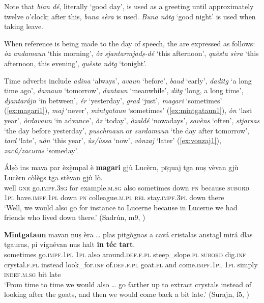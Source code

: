 Note that \textit{bian dé}, literally `good day', is used as a greeting until approximately twelve o'clock; after this, \textit{buna sèra} is used. \textit{Buna nòtg} `good night' is used when taking leave. 

When reference is being made to the day of speech, the  are expressed as follows: \textit{òz andamaun} `this morning', \textit{òz sjantarmjadṣ-dé} `this afternoon', \textit{quèsta sèra} `this afternoon, this evening', \textit{quèsta nòtg} `tonight'.

Time adverbs include \textit{adina} `always', \textit{avaun} `before', \textit{baud} `early', \textit{daditg} `a long time ago', \textit{damaun} `tomorrow', \textit{dantaun} `meanwhile', \textit{ditg} `long, a long time', \textit{djantarájn} `in between', \textit{ér} `yesterday', \textit{grad} `just', \textit{magari} `sometimes' (\ref{ex:magari1}), \textit{maj} `never', \textit{mintgataun} `sometimes' (\ref{ex:mintgataun1}), \textit{òn} `last year', \textit{òrdavaun} `in advance', \textit{òz} `today', \textit{òzaldé} `nowadays', \textit{savèns} `often', \textit{stjarsas} `the day before yesterday', \textit{pusch\-maun} or \textit{surdamaun} `the day after tomorrow', \textit{tard} `late', \textit{uòn} `this year', \textit{ùs/ùssa} `now', \textit{vònzaj} `later' (\ref{ex:vonzaj1}), \textit{zacú/zacuras} `someday'.

\ea
\label{ex:magari1}
	\gll  Álṣò ins mava par èxè̱mpal è \textbf{magari} gjù Lucèrn, pr̩quaj tga nuṣ vèvan gjù Lucèrn còlègs tga stèvan gjù lò.\\
well \textsc{gnr} go.\textsc{impf.3sg} for example\textsc{.m.sg} also sometimes down \textsc{pn} because \textsc{subord} \textsc{1pl} have.\textsc{impf.1pl} down \textsc{pn} colleague.\textsc{m.pl} \textsc{rel} stay.\textsc{impf.3pl} down there\\
\glt `Well, we would also go for instance to Lucerne because in Lucerne we had friends who lived down there.' (Sadrún, m9, )
\z

\ea
\label{ex:mintgataun1}
\gll \textbf{Mintgataun} mavan nuṣ èra … plas pitgògnas a cavá cristalas anstagl mirá dlas tgauras, pi vignévan nus halt \textbf{in} \textbf{téc} \textbf{tart}. \\
sometimes go.\textsc{impf.1pl} \textsc{1pl} also {} around.\textsc{def.f.pl}  steep\_slope.\textsc{pl} \textsc{subord} dig.\textsc{inf} crystal.\textsc{f.pl} instead look\_for.\textsc{inf} of.\textsc{def.f.pl} goat.\textsc{pl} and come.\textsc{impf.1pl} \textsc{1pl} simply \textsc{indef.m.sg} bit late \\
\glt `From time to time we would also … go farther up to extract crystals instead of looking after the goats, and then we would come back a bit late.' (Surajn, f5, )
\z

